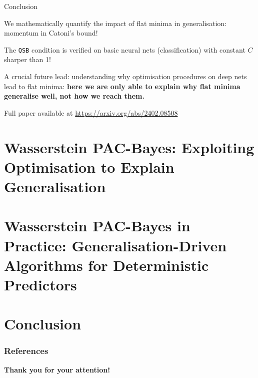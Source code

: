 \documentclass{presentation}
\begin{document}
\begin{xframe}{Conclusion}
    \vspace{1cm}
    \Large
    \begin{xitemize}
        \item We mathematically quantify the impact of flat minima in generalisation: momentum in Catoni's bound!
        \item The \texttt{QSB} condition is verified on basic neural nets (classification) with constant $C$ sharper than 1! 
        \item A crucial future lead: understanding why optimisation procedures on deep nets lead to flat minima: \textbf{here we are only able to explain why flat minima generalise well, not how we reach them.}
    \end{xitemize}

    Full paper available at \url{https://arxiv.org/abs/2402.08508}
    
\end{xframe}

\section{Wasserstein PAC-Bayes: Exploiting Optimisation to Explain Generalisation}


\section{Wasserstein PAC-Bayes in Practice: Generalisation-Driven Algorithms for Deterministic Predictors}


\section{Conclusion}









\appendix

\begin{frame}
  \frametitle{References}
  \printbibliography[title={References}]
 \end{frame}

\begin{xtitle}

\vspace{2.0cm}
{\bf Thank you for your attention!}\\

\end{xtitle}

 
\end{document}
